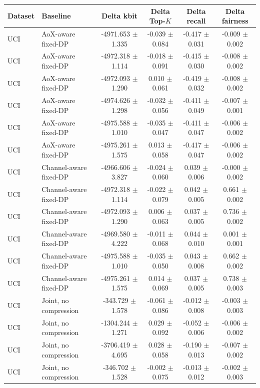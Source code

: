 \begin{tabular}{llcccc}
\toprule
Dataset & Baseline & Delta kbit & Delta Top-$K$ & Delta recall & Delta fairness \\
\midrule
UCI & AoX-aware fixed-DP & -4971.653 $\pm$ 1.335 & -0.039 $\pm$ 0.084 & -0.417 $\pm$ 0.031 & -0.009 $\pm$ 0.002 \\
UCI & AoX-aware fixed-DP & -4972.318 $\pm$ 1.114 & -0.018 $\pm$ 0.091 & -0.415 $\pm$ 0.030 & -0.008 $\pm$ 0.002 \\
UCI & AoX-aware fixed-DP & -4972.093 $\pm$ 1.290 & 0.010 $\pm$ 0.061 & -0.419 $\pm$ 0.032 & -0.008 $\pm$ 0.002 \\
UCI & AoX-aware fixed-DP & -4974.626 $\pm$ 1.298 & -0.032 $\pm$ 0.056 & -0.411 $\pm$ 0.049 & -0.007 $\pm$ 0.001 \\
UCI & AoX-aware fixed-DP & -4975.588 $\pm$ 1.010 & -0.035 $\pm$ 0.047 & -0.411 $\pm$ 0.047 & -0.006 $\pm$ 0.002 \\
UCI & AoX-aware fixed-DP & -4975.261 $\pm$ 1.575 & 0.013 $\pm$ 0.058 & -0.417 $\pm$ 0.047 & -0.006 $\pm$ 0.002 \\
UCI & Channel-aware fixed-DP & -4966.606 $\pm$ 3.827 & -0.024 $\pm$ 0.060 & 0.039 $\pm$ 0.006 & -0.000 $\pm$ 0.002 \\
UCI & Channel-aware fixed-DP & -4972.318 $\pm$ 1.114 & -0.022 $\pm$ 0.079 & 0.042 $\pm$ 0.005 & 0.661 $\pm$ 0.002 \\
UCI & Channel-aware fixed-DP & -4972.093 $\pm$ 1.290 & 0.006 $\pm$ 0.063 & 0.037 $\pm$ 0.005 & 0.736 $\pm$ 0.002 \\
UCI & Channel-aware fixed-DP & -4969.580 $\pm$ 4.222 & -0.011 $\pm$ 0.068 & 0.044 $\pm$ 0.010 & 0.001 $\pm$ 0.001 \\
UCI & Channel-aware fixed-DP & -4975.588 $\pm$ 1.010 & -0.035 $\pm$ 0.050 & 0.043 $\pm$ 0.008 & 0.662 $\pm$ 0.002 \\
UCI & Channel-aware fixed-DP & -4975.261 $\pm$ 1.575 & 0.014 $\pm$ 0.069 & 0.037 $\pm$ 0.005 & 0.738 $\pm$ 0.003 \\
UCI & Joint, no compression & -343.729 $\pm$ 1.578 & -0.061 $\pm$ 0.086 & -0.012 $\pm$ 0.008 & -0.003 $\pm$ 0.003 \\
UCI & Joint, no compression & -1304.244 $\pm$ 1.271 & 0.029 $\pm$ 0.092 & -0.052 $\pm$ 0.006 & -0.006 $\pm$ 0.002 \\
UCI & Joint, no compression & -3706.419 $\pm$ 4.695 & 0.028 $\pm$ 0.058 & -0.190 $\pm$ 0.013 & -0.007 $\pm$ 0.002 \\
UCI & Joint, no compression & -346.702 $\pm$ 1.528 & -0.002 $\pm$ 0.075 & -0.013 $\pm$ 0.012 & -0.002 $\pm$ 0.003 \\

\end{tabular}
